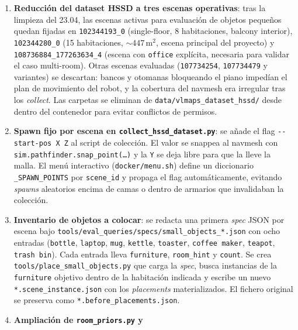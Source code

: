 \documentclass[11pt,a4paper]{article}
\begin{document}
\begin{enumerate}
  \item \textbf{Reducción del dataset HSSD a tres escenas operativas}:
        tras la limpieza del 23.04, las escenas activas para evaluación
        de objetos pequeños quedan fijadas en \texttt{102344193\_0}
        (single-floor, 8 habitaciones, balcony interior), \texttt{102344280\_0}
        (15 habitaciones, ${\sim}447\,\text{m}^2$, escena principal del
        proyecto) y \texttt{108736884\_177263634\_4} (escena con
        \texttt{office} explícita, necesaria para validar el caso
        multi-room). Otras escenas evaluadas
        (\texttt{107734254}, \texttt{107734479} y variantes) se
        descartan: bancos y otomanas bloqueando el piano impedían el
        plan de movimiento del robot, y la cobertura del navmesh era
        irregular tras los \emph{collect}. Las carpetas se eliminan de
        \texttt{data/vlmaps\_dataset\_hssd/} desde dentro del contenedor
        para evitar conflictos de permisos.
  \item \textbf{Spawn fijo por escena en \texttt{collect\_hssd\_dataset.py}}:
        se añade el flag \texttt{-{}-start-pos X Z} al script de
        colección. El valor se snappea al navmesh con
        \texttt{sim.pathfinder.snap\_point(\dots)} y la \texttt{Y} se
        deja libre para que la lleve la malla. El menú interactivo
        (\texttt{docker/menu.sh}) define un diccionario
        \texttt{\_SPAWN\_POINTS} por \texttt{scene\_id} y propaga el
        flag automáticamente, evitando \emph{spawns} aleatorios encima
        de camas o dentro de armarios que invalidaban la colección.
  \item \textbf{Inventario de objetos a colocar}: se redacta una primera
        \emph{spec} JSON por escena bajo
        \texttt{tools/eval\_queries/specs/small\_objects\_*.json} con
        ocho entradas (\texttt{bottle}, \texttt{laptop}, \texttt{mug},
        \texttt{kettle}, \texttt{toaster}, \texttt{coffee\,maker},
        \texttt{teapot}, \texttt{trash\,bin}). Cada entrada lleva
        \texttt{furniture}, \texttt{room\_hint} y \texttt{count}. Se
        crea \texttt{tools/place\_small\_objects.py} que carga la
        \emph{spec}, busca instancias de la \texttt{furniture} objetivo
        dentro de la habitación indicada y escribe un nuevo
        \texttt{*.scene\_instance.json} con los \emph{placements}
        materializados. El fichero original se preserva como
        \texttt{*.before\_placements.json}.
  \item \textbf{Ampliación de \texttt{room\_priors.py} y
}
\end{enumerate}
\end{document}
